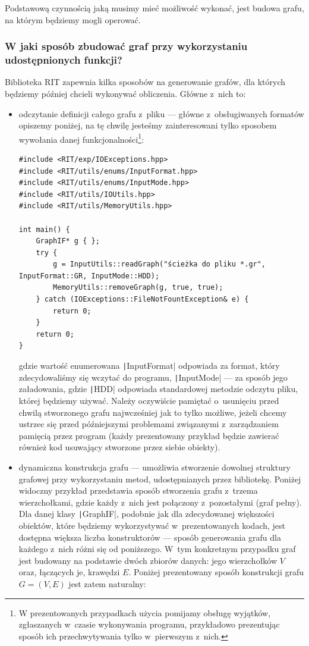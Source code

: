 Podstawową czynnością jaką musimy mieć możliwość wykonać, jest budowa grafu, na którym będziemy mogli operować. 

\subsubsection{W jaki sposób zbudować graf przy wykorzystaniu udostępnionych funkcji?}

Biblioteka \textsc{RIT} zapewnia kilka sposobów na generowanie grafów, dla których będziemy później chcieli wykonywać obliczenia. Główne z~nich to:
\begin{itemize}
	\item odczytanie definicji całego grafu z~pliku --- główne z~obsługiwanych formatów opiszemy poniżej, na tę chwilę jesteśmy zainteresowani tylko sposobem wywołania danej funkcjonalności\footnote{W prezentowanych przypadkach użycia pomijamy obsługę wyjątków, zgłaszanych w~czasie wykonywania programu, przykładowo prezentując sposób ich przechwytywania tylko w~pierwszym z~nich.}:
	
	\begin{verbatim}
#include <RIT/exp/IOExceptions.hpp>
#include <RIT/utils/enums/InputFormat.hpp>
#include <RIT/utils/enums/InputMode.hpp>
#include <RIT/utils/IOUtils.hpp>
#include <RIT/utils/MemoryUtils.hpp>

int main() {
	GraphIF* g { };
	try {
		g = InputUtils::readGraph("ścieżka do pliku *.gr", InputFormat::GR, InputMode::HDD);
		MemoryUtils::removeGraph(g, true, true);
	} catch (IOExceptions::FileNotFountException& e) {
		return 0;
	}
	return 0;
}
	\end{verbatim}
	
	gdzie wartość enumerowana \texttt|InputFormat| odpowiada za format, który zdecydowaliśmy się wczytać do programu, \texttt|InputMode| --- za sposób jego załadowania, gdzie \texttt|HDD| odpowiada standardowej metodzie odczytu pliku, której będziemy używać. Należy oczywiście pamiętać o~usunięciu przed chwilą stworzonego grafu najwcześniej jak to tylko możliwe, jeżeli chcemy ustrzec się przed późniejszymi problemami związanymi z~zarządzaniem pamięcią przez program (każdy prezentowany przykład będzie zawierać również kod usuwający stworzone przez siebie obiekty).
	\item dynamiczna konstrukcja grafu --- umożliwia stworzenie dowolnej struktury grafowej przy wykorzystaniu metod, udostępnianych przez bibliotekę. Poniżej widoczny przykład przedstawia sposób stworzenia grafu z~trzema wierzchołkami, gdzie każdy z~nich jest połączony z~pozostałymi (graf pełny). Dla danej klasy \texttt|GraphIF|, podobnie jak dla zdecydowanej większości obiektów, które będziemy wykorzystywać w~prezentowanych kodach, jest dostępna większa liczba konstruktorów --- sposób generowania grafu dla każdego z~nich różni się od poniższego. W~tym konkretnym przypadku graf jest budowany na podstawie dwóch zbiorów danych: jego wierzchołków $V$ oraz, łączących je, krawędzi $E$. Poniżej prezentowany sposób konstrukcji grafu $G = \left( V, E \right)$ jest zatem naturalny:
	

\end{itemize}
